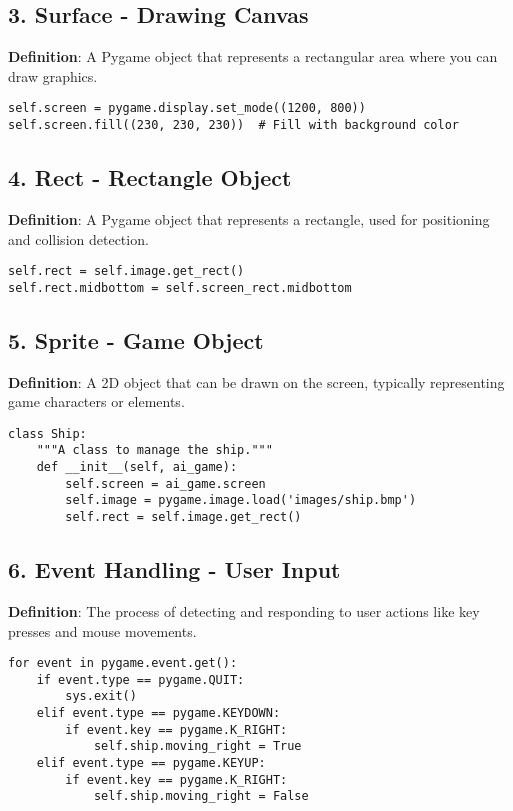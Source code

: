 \subsection*{3. Surface - Drawing Canvas}
\textbf{Definition}: A Pygame object that represents a rectangular area where you can draw graphics.

\begin{lstlisting}
self.screen = pygame.display.set_mode((1200, 800))
self.screen.fill((230, 230, 230))  # Fill with background color
\end{lstlisting}

\subsection*{4. Rect - Rectangle Object}
\textbf{Definition}: A Pygame object that represents a rectangle, used for positioning and collision detection.

\begin{lstlisting}
self.rect = self.image.get_rect()
self.rect.midbottom = self.screen_rect.midbottom
\end{lstlisting}

\subsection*{5. Sprite - Game Object}
\textbf{Definition}: A 2D object that can be drawn on the screen, typically representing game characters or elements.

\begin{lstlisting}
class Ship:
    """A class to manage the ship."""
    def __init__(self, ai_game):
        self.screen = ai_game.screen
        self.image = pygame.image.load('images/ship.bmp')
        self.rect = self.image.get_rect()
\end{lstlisting}

\subsection*{6. Event Handling - User Input}
\textbf{Definition}: The process of detecting and responding to user actions like key presses and mouse movements.

\begin{lstlisting}
for event in pygame.event.get():
    if event.type == pygame.QUIT:
        sys.exit()
    elif event.type == pygame.KEYDOWN:
        if event.key == pygame.K_RIGHT:
            self.ship.moving_right = True
    elif event.type == pygame.KEYUP:
        if event.key == pygame.K_RIGHT:
            self.ship.moving_right = False
\end{lstlisting}

